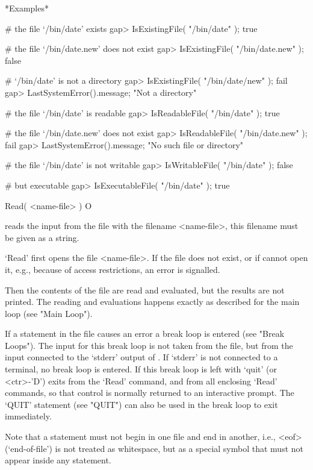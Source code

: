 *Examples*

\beginexample
# the file `/bin/date' exists
gap> IsExistingFile( "/bin/date" );    
true

# the file `/bin/date.new' does not exist
gap> IsExistingFile( "/bin/date.new" );
false

# `/bin/date' is not a directory
gap> IsExistingFile( "/bin/date/new" );
fail
gap> LastSystemError().message;
"Not a directory"

# the file `/bin/date' is readable
gap> IsReadableFile( "/bin/date" );
true

# the file `/bin/date.new' does not exist
gap> IsReadableFile( "/bin/date.new" );
fail
gap> LastSystemError().message;        
"No such file or directory"

# the file `/bin/date' is not writable
gap> IsWritableFile( "/bin/date" );
false

# but executable
gap> IsExecutableFile( "/bin/date" );
true
\endexample



\>Read( <name-file> ) O

reads   the input from  the  file  with  the  filename <name-file>,  this
filename must be given as a string.

`Read' first opens the file <name-file>.  If the file  does not exist, or
if {\GAP} cannot open it, e.g., because of access restrictions,
an error is signalled.

Then the contents of the file are read and evaluated, but the results are
not printed.  The reading and evaluations happens exactly as described
for the main loop (see "Main Loop").

If a statement in the file causes an error a break loop is entered (see
"Break Loops").  The input for this break loop is not taken from the
file, but from the input connected to the `stderr' output of {\GAP}.  If
`stderr' is not connected to a terminal, no break loop is entered.  If
this break loop is left with `quit' (or <ctr>-'D') {\GAP} exits from the
`Read' command, and from all enclosing `Read' commands, so that control
is normally returned to an interactive prompt. The `QUIT' statement (see
"QUIT") can also be used in the break loop to exit {\GAP} immediately.

Note that  a statement must  not begin in one  file  and end  in another,
i.e.,  <eof> (`end-of-file') is not    treated as whitespace,  but as   a
special symbol that must not appear inside any statement.

